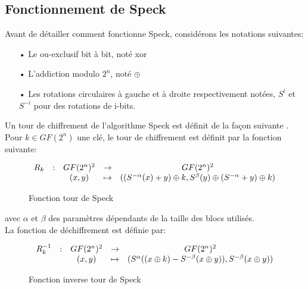 \subsection{Fonctionnement de Speck}

Avant de détailler comment fonctionne Speck, considérons les notations suivantes:

\begin{enumerate}
	\item[•] Le ou-exclusif bit à bit, noté xor
	\item[•] L'addiction modulo $2^n$, noté $\mathbin{\oplus}$
	\item[•] Les rotations circulaires à gauche et à droite respectivement notées,
	      $S^i$ et $S^{-i}$ pour des rotations de i-bits.
\end{enumerate}

Un tour de chiffrement de l'algorithme Speck est définit de la façon suivante \cite{speck_families}. \\
Pour $k \in GF(2^n)$ une clé, le tour de chiffrement est définit par la fonction suivante:

\begin{figure}[H]
	\centering
	\[
		\begin{array}{ccccc}
			R_k & : & GF(2^n)^2 & \to     & GF(2^n)^2                                                                \\
			    &   & (x,y)     & \mapsto & ((S^{-\alpha}(x) + y) \mathbin{\oplus} k, S^\beta (y) \mathbin{\oplus} (S^{-\alpha} + y) \mathbin{\oplus} k) \\
		\end{array}
	\]
	\caption{Fonction tour de Speck}
	\label{tourSpeck}
\end{figure}



avec $\alpha$ et $\beta$ des paramètres dépendants de la taille des blocs utilisés. \\

La fonction de déchiffrement est définie par:

\begin{figure}[H]
	\centering
	\[
		\begin{array}{ccccc}
			R_k^{-1} & : & GF(2^n)^2 & \to     & GF(2^n)^2                                                            \\
			         &   & (x,y)     & \mapsto & (S^\alpha ((x \mathbin{\oplus} k) - S^{-\beta}(x \mathbin{\oplus} y)), S^{-\beta}(x \mathbin{\oplus} y)) \\
		\end{array}
	\]
	\caption{Fonction inverse tour de Speck}
	\label{tourSpeck}
\end{figure}



